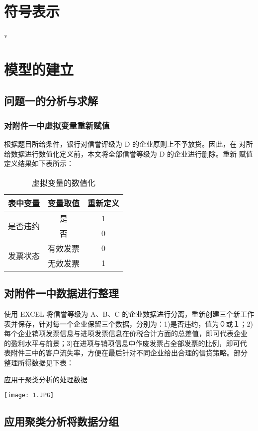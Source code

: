 \documentclass{article}
\begin{document}
\section{符号表示}
v
    \section{模型的建立}
    \subsection{ 问题一的分析与求解}
    \subsubsection{对附件一中虚拟变量重新赋值}
    根据题目所给条件，银行对信誉评级为 D 的企业原则上不予放贷。因此，在
对所给数据进行数值化定义前，本文将全部信誉等级为 D 的企业进行删除。重新
赋值定义结果如下表所示：
    \begin{table}[htbp]
        \centering
        \caption{虚拟变量的数值化}
        \begin{tabular}{|c|c|c|}
            \hline
            表中变量 & 变量取值 & 重新定义\\
            \hline
            \multirow{2}{*}{是否违约} & 是 & 1 \\
                                    & 否 & 0\\
            \hline
            \multirow{2}{*}{发票状态} & 有效发票 & 0 \\
                                     & 无效发票 & 1 \\
            \hline
            \end{tabular}
    \end{table}
    \subsection{对附件一中数据进行整理}
    使用 EXCEL 将信誉等级为 A、B、C 的企业数据进行分离，重新创建三个新工作
表并保存，针对每一个企业保留三个数据，分别为：1)是否违约，值为０或１；2)
每个企业销项发票信息与进项发票信息在价税合计方面的总差值，即可代表企业
的盈利水平与前景；3)在进项与销项信息中作废发票占全部发票的比例，即可代
表附件三中的客户流失率，方便在最后针对不同企业给出合理的信贷策略。部分
整理所得数据见下表：
    \begin{table}[htbp]
        \centering
        \caption{应用于聚类分析的处理数据}
        \texttt{[image: 1.JPG]}
    \end{table}
\subsection{应用聚类分析将数据分组}
\end{document}
